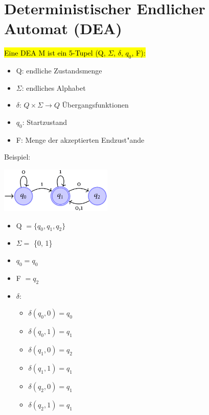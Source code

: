 \documentclass[11pt, a4paper]{scrartcl}
\begin{document}
\newpage

\section{Deterministischer Endlicher Automat (DEA)}

\hl{Eine DEA M ist ein 5-Tupel (Q, $\Sigma$, $\delta$, $q_0$, F):}

\begin{itemize}
    \item Q: endliche Zustandsmenge
    \item $\Sigma$: endliches Alphabet
    \item $\delta$: $Q \times \Sigma \rightarrow Q$ Übergangsfunktionen
    \item $q_0$: Startzustand
    \item F: Menge der akzeptierten Endzust"ande
\end{itemize}

\vspace{2em}
Beispiel:
\vspace{1em}

\includegraphics[width=0.4\textwidth]{DEA-00.png}

\begin{itemize}
    \item Q $= \{q_0, q_1, q_2\}$
    \item $\Sigma =$ \{0, 1\}
    \item $q_0 = q_0$
    \item F $= q_2$
    \item $\delta$:
    \begin{itemize}[label={}]
        \item $\delta(q_0, 0) = q_0$
        \item $\delta(q_0, 1) = q_1$
        \item $\delta(q_1, 0) = q_2$
        \item $\delta(q_1, 1) = q_1$
        \item $\delta(q_2, 0) = q_1$
        \item $\delta(q_2, 1) = q_1$
      \end{itemize}
\end{itemize}

\newpage
\end{document}
